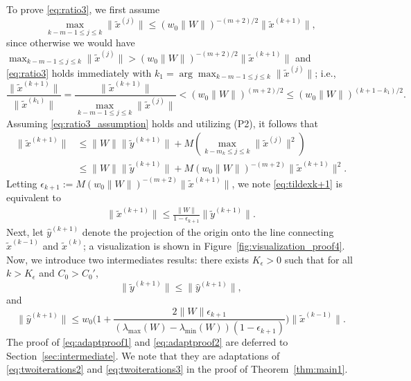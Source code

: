 \documentclass[11pt]{article}
\begin{document}
{{To prove \eqref{eq:ratio3}, we first assume %
\begin{equation}\label{eq:ratio3_assumption}
\max_{k-m-1\leq j\leq k}\|\widetilde{x}^{(j)}\|\leq (w_0\|W\|)^{-(m+2)/2}\|\widetilde{x}^{(k+1)}\|,
\end{equation}
since otherwise we would have $\max_{k-m-1\leq j\leq k}\|\widetilde{x}^{(j)}\|> (w_0\|W\|)^{-(m+2)/2}\|\widetilde{x}^{(k+1)}\|$ and  \eqref{eq:ratio3} holds immediately with $k_1=\arg\max_{k-m-1\leq j\leq k}\|\widetilde{x}^{(j)}\|$; i.e.,
\[
\frac{\|\widetilde{x}^{(k+1)}\|}{\|\widetilde{x}^{(k_1)}\|}=\frac{\|\widetilde{x}^{(k+1)}\|}{\max_{k-m-1\leq j\leq k}\|\widetilde{x}^{(j)}\|}< (w_0\|W\|)^{(m+2)/2}\leq(w_0\|W\|)^{(k+1-k_1)/2}.
\]
Assuming \eqref{eq:ratio3_assumption} holds and utilizing (P2), it follows that %
\begin{align}\label{eq:tildexk+1}
\|\widetilde{x}^{(k+1)}\| &\leq \|W\|\|\widetilde{y}^{(k+1)}\|+M(\max_{k-m_k\leq j\leq k}\|\widetilde{x}^{(j)}\|^2) \nonumber \\
&\leq \|W\|\|\widetilde{y}^{(k+1)}\|+M(w_0\|W\|)^{-(m+2)}\|\widetilde{x}^{(k+1)}\|^2. 
\end{align}
Letting $\epsilon_{k+1}:=M(w_0\|W\|)^{-(m+2)}\|\widetilde{x}^{(k+1)}\|$, we note  \eqref{eq:tildexk+1} is equivalent to 
\begin{align}\label{eq:tildexk+12}
\|\widetilde{x}^{(k+1)}\|\leq \frac{\|W\|}{1-\epsilon_{k+1}}\|\widetilde{y}^{(k+1)}\|.
\end{align}
Next, let $\widehat{y}^{(k+1)}$ denote the projection of the origin onto the line connecting $\widetilde{x}^{(k-1)}$ and $\widetilde{x}^{(k)}$; a visualization is shown in Figure~\ref{fig:visualization_proof4}. 
Now, we introduce two intermediates results: there exists $K_\epsilon>0$ such that for all $k>K_\epsilon$ and $C_0>C_0'$, 
\begin{equation}\label{eq:adaptproof1}
\|\widetilde{y}^{(k+1)}\|\leq \|\widehat{y}^{(k+1)}\|,\end{equation}  
and
\begin{equation}\label{eq:adaptproof2}
\|\widehat{y}^{(k+1)}\| \leq  w_0\Big(1+\frac{2{\|W\|\epsilon_{k+1}}}{(\lambda_{\max}(W)-\lambda_{\min}(W))({1-\epsilon_{k+1}})}\Big)\|\widetilde{x}^{(k-1)}\|.
\end{equation}
The proof of \eqref{eq:adaptproof1} and \eqref{eq:adaptproof2} are deferred to Section~\ref{sec:intermediate}. We note that they are adaptations of \eqref{eq:twoiterations2} and \eqref{eq:twoiterations3} in the proof of Theorem~\ref{thm:main1}.


}}
\end{document}
